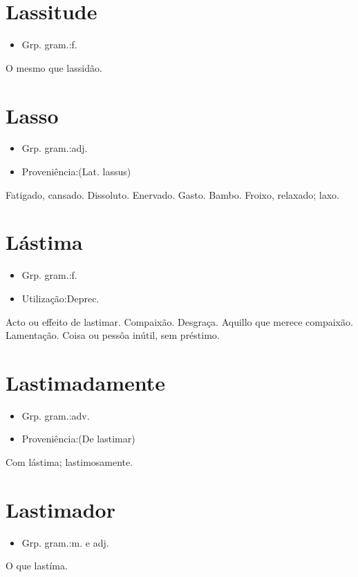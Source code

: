 \section{Lassitude}
\begin{itemize}
\item {Grp. gram.:f.}
\end{itemize}
O mesmo que \textunderscore lassidão\textunderscore .
\section{Lasso}
\begin{itemize}
\item {Grp. gram.:adj.}
\end{itemize}
\begin{itemize}
\item {Proveniência:(Lat. \textunderscore lassus\textunderscore )}
\end{itemize}
Fatigado, cansado.
Dissoluto.
Enervado.
Gasto.
Bambo.
Froixo, relaxado; laxo.
\section{Lástima}
\begin{itemize}
\item {Grp. gram.:f.}
\end{itemize}
\begin{itemize}
\item {Utilização:Deprec.}
\end{itemize}
Acto ou effeito de lastimar.
Compaixão.
Desgraça.
Aquillo que merece compaixão.
Lamentação.
Coisa ou pessôa inútil, sem préstimo.
\section{Lastimadamente}
\begin{itemize}
\item {Grp. gram.:adv.}
\end{itemize}
\begin{itemize}
\item {Proveniência:(De \textunderscore lastimar\textunderscore )}
\end{itemize}
Com lástima; lastimosamente.
\section{Lastimador}
\begin{itemize}
\item {Grp. gram.:m.  e  adj.}
\end{itemize}
O que lastíma.
